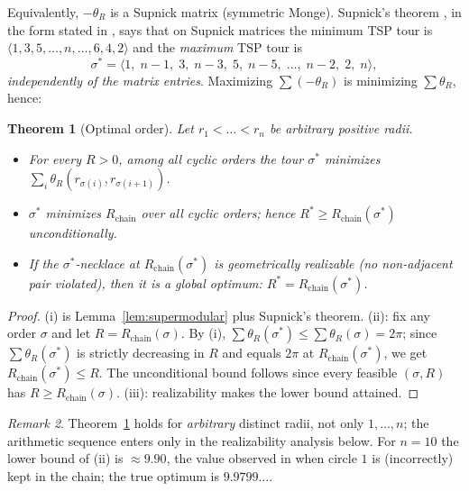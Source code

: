 \documentclass[11pt]{article}
\newtheorem{theorem}{Theorem}
\theoremstyle{definition}
\theoremstyle{remark}
\newtheorem{remark}[theorem]{Remark}
\begin{document}
Equivalently, $-\theta_R$ is a Supnick matrix (symmetric Monge). Supnick's theorem \cite{supnick}, in the form stated in \cite[Sec.~2]{bdvvw}, says that on Supnick matrices the minimum TSP tour is $\langle 1,3,5,\dots,n,\dots,6,4,2\rangle$ and the \emph{maximum} TSP tour is
\[
\sigma^\ast=\langle 1,\; n-1,\; 3,\; n-3,\; 5,\; n-5,\;\dots,\; n-2,\; 2,\; n\rangle,
\]
\emph{independently of the matrix entries}. Maximizing $\sum(-\theta_R)$ is minimizing $\sum\theta_R$, hence:

\begin{theorem}[Optimal order]\label{thm:A}
Let $r_1<\dots<r_n$ be arbitrary positive radii.
\begin{itemize}
\item[(i)] For every $R>0$, among all cyclic orders the tour $\sigma^\ast$ minimizes $\sum_i\theta_R(r_{\sigma(i)},r_{\sigma(i+1)})$.
\item[(ii)] $\sigma^\ast$ minimizes $R_{\mathrm{chain}}$ over all cyclic orders; hence $R^\ast\ge R_{\mathrm{chain}}(\sigma^\ast)$ unconditionally.
\item[(iii)] If the $\sigma^\ast$-necklace at $R_{\mathrm{chain}}(\sigma^\ast)$ is geometrically realizable (no non-adjacent pair violated), then it is a global optimum: $R^\ast=R_{\mathrm{chain}}(\sigma^\ast)$.
\end{itemize}
\end{theorem}

\begin{proof}
(i) is Lemma~\ref{lem:supermodular} plus Supnick's theorem. (ii): fix any order $\sigma$ and let $R=R_{\mathrm{chain}}(\sigma)$. By (i), $\sum\theta_{R}(\sigma^\ast)\le\sum\theta_{R}(\sigma)=2\pi$; since $\sum\theta_R(\sigma^\ast)$ is strictly decreasing in $R$ and equals $2\pi$ at $R_{\mathrm{chain}}(\sigma^\ast)$, we get $R_{\mathrm{chain}}(\sigma^\ast)\le R$. The unconditional bound follows since every feasible $(\sigma,R)$ has $R\ge R_{\mathrm{chain}}(\sigma)$. (iii): realizability makes the lower bound attained.
\end{proof}

\begin{remark}
Theorem~\ref{thm:A} holds for \emph{arbitrary} distinct radii, not only $1,\dots,n$; the arithmetic sequence enters only in the realizability analysis below. For $n=10$ the lower bound of (ii) is $\approx 9.90$, the value observed in \cite{mse} when circle $1$ is (incorrectly) kept in the chain; the true optimum is $9.9799\ldots$.
\end{remark}
\end{document}
